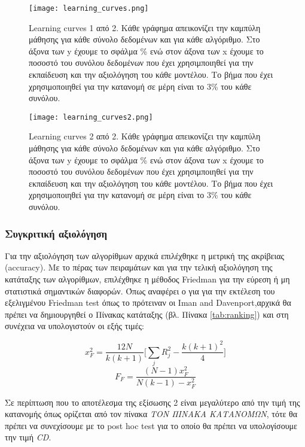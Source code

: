 \begin{figure}
	\centering %
	\texttt{[image: learning\_curves.png]}
	\caption{Learning curves 1 από 2. Κάθε γράφημα απεικονίζει την καμπύλη μάθησης για κάθε σύνολο δεδομένων και για κάθε αλγόριθμο. Στο άξονα των y έχουμε το σφάλμα \% ενώ στον άξονα των x έχουμε το ποσοστό του συνόλου δεδομένων που έχει χρησιμποιηθεί για την εκπαίδευση και την αξιολόγηση του κάθε μοντέλου. Το βήμα που έχει χρησιμοποιηθεί για την κατανομή σε μέρη είναι το 3\% του κάθε συνόλου.}
	\label{fig:learning_curves}
\end{figure}

\begin{figure}
	\centering %
	\texttt{[image: learning\_curves2.png]}
	\caption{Learning curves 2 από 2. Κάθε γράφημα απεικονίζει την καμπύλη μάθησης για κάθε σύνολο δεδομένων και για κάθε αλγόριθμο. Στο άξονα των y έχουμε το σφάλμα \% ενώ στον άξονα των x έχουμε το ποσοστό του συνόλου δεδομένων που έχει χρησιμποιηθεί για την εκπαίδευση και την αξιολόγηση του κάθε μοντέλου. Το βήμα που έχει χρησιμοποιηθεί για την κατανομή σε μέρη είναι το 3\% του κάθε συνόλου.}
	\label{fig:learning_curves2}
\end{figure}


\subsubsection{Συγκριτική αξιολόγηση}

Για την αξιολόγηση των αλγορίθμων αρχικά επιλέχθηκε η μετρική της ακρίβειας (accuracy).
 Με το πέρας των πειραμάτων και για την τελική αξιολόγηση της κατάταξης των αλγορίθμων, 
 επιλέχθηκε η μέθοδος Friedman για την εύρεση ή μη στατιστικά σημαντικών διαφορών. 
 Όπως αναφέρει ο \cite{demvsar} για για την εκτέλεση του εξελιγμένου Friedman test όπως 
 το πρότειναν οι {\color{red} Iman and Davenport},αρχικά θα πρέπει να δημιουργηθεί 
 ο Πίνακας κατάταξης (βλ. Πίνακα \ref{tab:ranking}) και στη συνέχεια να υπολογιστούν οι εξής τιμές:

\begin{equation}
\label{eq:X_def}
	x_F^2 = \frac{12N}{k(k+1)}\Big[ \sum_{j}R_j^2 - \frac{k(k+1)^2}{4} \Big]  
\end{equation}
\begin{equation}
\label{eq:F_def}
	F_F = \frac{(N −1)x_F^2}{N(k-1)-x_F^2}
\end{equation}

Σε περίπτωση που το αποτέλεσμα της εξίσωσης 2 είναι μεγαλύτερο από την τιμή της κατανομής όπως ορίζεται 
από τον πίνακα \emph{\color{red} ΤΟΝ ΠΙΝΑΚΑ ΚΑΤΑΝΟΜΩΝ}, τότε θα πρέπει να συνεχίσουμε με το post hoc test
 για το οποίο θα πρέπει να υπολογίσουμε την τιμή \emph{CD}.

